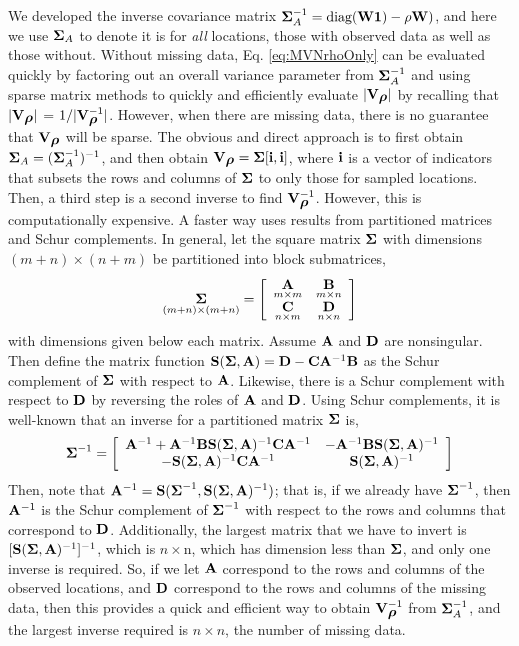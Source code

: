 \documentclass[11pt, titlepage]{article}\usepackage[]{graphicx}\usepackage[]{color}
\begin{document}
\begin{spacing}{1.9}
\begin{flushleft}
We developed the inverse covariance matrix $\mbox{\boldmath $\Sigma$}_A^{-1} = \textrm{diag}(\mathbf{W}\mathbf{1}) - \rho\mathbf{W})$, and here we use $\mbox{\boldmath $\Sigma$}_A$ to denote it is for \emph{all} locations, those with observed data as well as those without. Without missing data, Eq. \ref{eq:MVNrhoOnly} can be evaluated quickly by factoring out an overall variance parameter from $\mbox{\boldmath $\Sigma$}_A^{-1}$ and using sparse matrix methods to quickly and efficiently evaluate $|\mathbf{V}_{\mbox{\boldmath $\rho$}}|$ by recalling that $|\mathbf{V}_{\mbox{\boldmath $\rho$}}|$ = $1/|\mathbf{V}^{-1}_{\mbox{\boldmath $\rho$}}|$.  However, when there are missing data, there is no guarantee that $\mathbf{V}_{\mbox{\boldmath $\rho$}}$ will be sparse.  The obvious and direct approach is to first obtain $\mbox{\boldmath $\Sigma$}_A = (\mbox{\boldmath $\Sigma$}_A^{-1})^{-1}$, and then obtain $\mathbf{V}_{\mbox{\boldmath $\rho$}} = \mbox{\boldmath $\Sigma$}[\mathbf{i},\mathbf{i}]$, where $\mathbf{i}$ is a vector of indicators that subsets the rows and columns of $\mbox{\boldmath $\Sigma$}$ to only those for sampled locations.  Then, a third step is a second inverse to find $\mathbf{V}_{\mbox{\boldmath $\rho$}}^{-1}$.  However, this is computationally expensive.  A faster way uses results from partitioned matrices and Schur complements.  In general, let the square matrix $\mbox{\boldmath $\Sigma$}$ with dimensions $(m + n) \times (n + m)$ be partitioned into block submatrices,
\[
  \underset{(m+n) \times (m+n)}{\mbox{\boldmath $\Sigma$}} = \left[
    \begin{array}{cc}
	    \underset{m \times m}{\mathbf{A}} & \underset{m \times n}{\mathbf{B}} \\
	    \underset{n \times m}{\mathbf{C}} & \underset{n \times n}{\mathbf{D}}
    \end{array}
  \right]
\]
with dimensions given below each matrix. Assume $\mathbf{A}$ and $\mathbf{D}$ are nonsingular.  Then define the matrix function $\mathbf{S}(\mbox{\boldmath $\Sigma$},\mathbf{A}) = \mathbf{D} - \mathbf{C}\mathbf{A}^{-1}\mathbf{B}$ as the Schur complement of $\mbox{\boldmath $\Sigma$}$ with respect to $\mathbf{A}$.  Likewise, there is a Schur complement with respect to $\mathbf{D}$ by reversing the roles of $\mathbf{A}$ and $\mathbf{D}$.  Using Schur complements, it is well-known \citep[e.g,][p. 97]{Harv:matr:1997} that an inverse for a partitioned matrix $\mbox{\boldmath $\Sigma$}$ is,
\[
  \mbox{\boldmath $\Sigma$}^{-1} = \left[
    \begin{array}{cc}
      \mathbf{A}^{-1} + \mathbf{A}^{-1}\mathbf{B}\mathbf{S}(\mbox{\boldmath $\Sigma$},\mathbf{A})^{-1}\mathbf{C}\mathbf{A}^{-1} & -\mathbf{A}^{-1}\mathbf{B}\mathbf{S}(\mbox{\boldmath $\Sigma$},\mathbf{A})^{-1} \\
      -\mathbf{S}(\mbox{\boldmath $\Sigma$},\mathbf{A})^{-1}\mathbf{C}\mathbf{A}^{-1} & \mathbf{S}(\mbox{\boldmath $\Sigma$},\mathbf{A})^{-1}
    \end{array}
  \right]
\]
Then, note that $\mathbf{A}^{-1} = \mathbf{S}(\mbox{\boldmath $\Sigma$}^{-1}, \mathbf{S}(\mbox{\boldmath $\Sigma$},\mathbf{A})^{-1})$; that is, if we already have $\mbox{\boldmath $\Sigma$}^{-1}$, then $\mathbf{A}^{-1}$ is the Schur complement of $\mbox{\boldmath $\Sigma$}^{-1}$ with respect to the rows and columns that correspond to $\mathbf{D}$.  Additionally, the largest matrix that we have to invert is $[\mathbf{S}(\mbox{\boldmath $\Sigma$},\mathbf{A})^{-1}]^{-1}$, which is $n \times $n, which has dimension less than $\mbox{\boldmath $\Sigma$}$, and only one inverse is required. So, if we let $\mathbf{A}$ correspond to the rows and columns of the observed locations, and $\mathbf{D}$ correspond to the rows and columns of the missing data, then this provides a quick and efficient way to obtain $\mathbf{V}_{\mbox{\boldmath $\rho$}}^{-1}$ from $\mbox{\boldmath $\Sigma$}_A^{-1}$, and the largest inverse required is $n \times n$, the number of missing data.


\end{flushleft}
\end{spacing}
\end{document}

